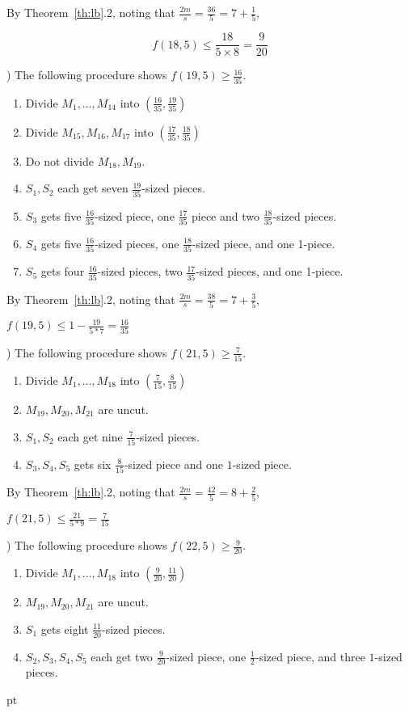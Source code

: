 \documentclass[12pt]{article}
\newenvironment{proof}
    {\pagebreak[1]{\narrower\noindent {\bf Proof:\quad\nopagebreak}}}{\QED}
\newcommand{\yyskip}{\penalty-50\vskip 5pt plus 3pt minus 2pt}
\newcommand{\blackslug}{\hbox{\hskip 1pt
        \vrule width 4pt height 8pt depth 1.5pt\hskip 1pt}}
\newcommand{\QED}{{\penalty10000\parindent 0pt\penalty10000
        \hskip 8 pt\nolinebreak\blackslug\hfill\lower 8.5pt\null}
        \par\yyskip\pagebreak[1]}
\begin{document}
\begin{proof}
By Theorem~\ref{th:lb}.2, noting that $\frac{2m}{s}=\frac{36}{5}=7+\frac{1}{5}$,

$$f(18,5) \le \frac{18}{5\times 8} = \frac{9}{20}$$

) The following procedure shows $f(19,5) \ge \frac{16}{35}$.

\begin{enumerate}
\item
Divide $M_1,\ldots,M_{14}$ into
$(\frac{16}{35},\frac{19}{35})$
\item
Divide $M_{15},M_{16},M_{17}$ into
$(\frac{17}{35},\frac{18}{35})$
\item
Do not divide $M_{18},M_{19}$.
\item
$S_1,S_2$ each get seven $\frac{19}{35}$-sized pieces.
\item
$S_3$ gets five $\frac{16}{35}$-sized piece, one $\frac{17}{35}$
piece and two $\frac{18}{35}$-sized pieces.
\item
$S_4$ gets five $\frac{16}{35}$-sized pieces, one $\frac{18}{35}$-sized piece,
and one 1-piece.
\item
$S_5$ gets four $\frac{16}{35}$-sized pieces, two $\frac{17}{35}$-sized pieces,
and one 1-piece.
\end{enumerate}

By Theorem~\ref{th:lb}.2, noting that $\frac{2m}{s}=\frac{38}{5}=7+\frac{3}{5}$,

$f(19,5) \le 1-\frac{19}{5*7}=\frac{16}{35}$ 

) The following procedure shows $f(21,5) \ge \frac{7}{15}$.

\begin{enumerate}
\item
Divide $M_1,\ldots,M_{18}$ into
$(\frac{7}{15},\frac{8}{15})$
\item
$M_{19},M_{20},M_{21}$ are uncut.
\item
$S_1,S_2$ each get nine $\frac{7}{15}$-sized pieces.
\item
$S_3,S_4,S_5$ gets six $\frac{8}{15}$-sized piece and  one $1$-sized piece.
\end{enumerate}

By Theorem~\ref{th:lb}.2, noting that $\frac{2m}{s}=\frac{42}{5}=8+\frac{2}{5}$,

$f(21,5) \le \frac{21}{5*9}=\frac{7}{15}$ 

) The following procedure shows $f(22,5) \ge \frac{9}{20}$.

\begin{enumerate}
\item
Divide $M_1,\ldots,M_{18}$ into
$(\frac{9}{20},\frac{11}{20})$
\item
$M_{19},M_{20},M_{21}$ are uncut.
\item
$S_1$ gets eight $\frac{11}{20}$-sized pieces.
\item
$S_2,S_3,S_4,S_5$ each get two $\frac{9}{20}$-sized piece, 
one $\frac{1}{2}$-sized piece, and three $1$-sized pieces.
\end{enumerate}


\end{proof}
\end{document}
